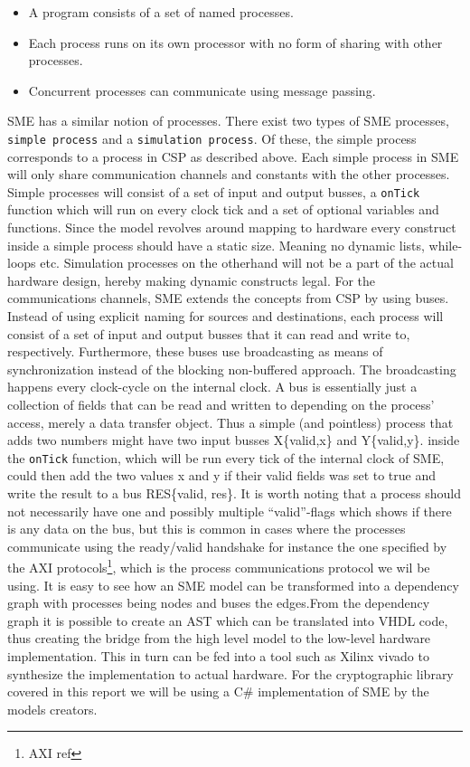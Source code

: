 \documentclass[a4paper]{article}
\begin{document}
\begin{itemize}
\item A program consists of a set of named processes.
\item Each process runs on its own processor with no form of sharing with other processes.
\item Concurrent processes can communicate using message passing.
\end{itemize}

SME has a similar notion of processes. There exist two types of SME processes, \texttt{simple process} and a \texttt{simulation process}. Of these, the simple process corresponds to a process in CSP as described above. Each simple process in SME will only share communication channels and constants with the other processes. Simple processes will consist of a set of input and output busses, a \texttt{onTick} function which will run on every clock tick and a set of optional variables and functions. Since the model revolves around mapping to hardware every construct inside a simple process should have a static size. Meaning no dynamic lists, while-loops etc. Simulation processes on the otherhand will not be a part of the actual hardware design, hereby making dynamic constructs legal.
For the communications channels, SME extends the concepts from CSP by using buses. Instead of using explicit naming for sources and destinations, each process will consist of a set of input and output busses that it can read and write to, respectively. Furthermore, these buses use broadcasting as means of synchronization instead of the blocking non-buffered approach.  The broadcasting happens every clock-cycle on the internal clock.
A bus is essentially just a collection of fields that can be read and written to depending on the process' access, merely a data transfer object. Thus a simple (and pointless) process that adds two numbers might have two input busses X\{valid,x\} and Y\{valid,y\}. inside the \texttt{onTick} function, which will be run every tick of the internal clock of SME, could then add the two values x and y if their valid fields was set to true and write the result to a bus RES\{valid, res\}. It is worth noting that a process should not necessarily have one and possibly multiple ``valid''-flags which shows if there is any data on the bus, but this is common in cases where the processes communicate using the ready/valid handshake for instance the one specified by the AXI protocols\footnote{AXI ref}, which is the process communications protocol we wil be using. It is easy to see how an SME model can be transformed into a dependency graph with processes being nodes and buses the edges.From the dependency graph it is possible to create an AST which can be translated into VHDL code\cite{SME}, thus creating the bridge from the high level model to the low-level hardware implementation. This in turn can be fed into a tool such as Xilinx vivado to synthesize the implementation to actual hardware. For the cryptographic library covered in this report we will be using a C\# implementation of SME by the models creators\cite{SME}.
\end{document}
